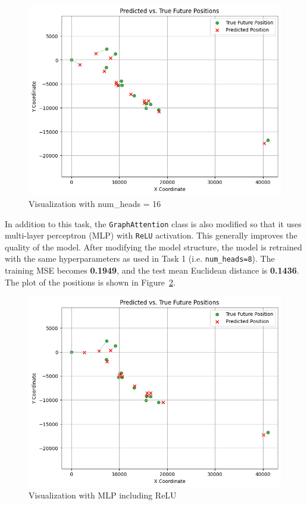 \documentclass[conference]{IEEEtran}
\begin{document}
\begin{figure}[htbp]
    \centering
    \includegraphics[width=0.8\linewidth]{figvisual2.png}
    \caption{Visualization with num\_heads = 16}
    \label{fig:visual2}
\end{figure}

In addition to this task, the \texttt{GraphAttention} class is also modified
so that it uses multi-layer perceptron (MLP) with \texttt{ReLU} activation.
This generally improves the quality of the model. After modifying the model
structure, the model is retrained with the same hyperparameters as used in Task
1 (i.e. \texttt{num\_heads=8}). The training MSE becomes \textbf{0.1949}, and
the test mean Euclidean distance is \textbf{0.1436}. The plot of the positions
is shown in Figure~\ref{fig:visual25}.

\begin{figure}[htbp]
    \centering
    \includegraphics[width=0.8\linewidth]{figvisual25.png}
    \caption{Visualization with MLP including ReLU}
    \label{fig:visual25}
\end{figure}
\end{document}
